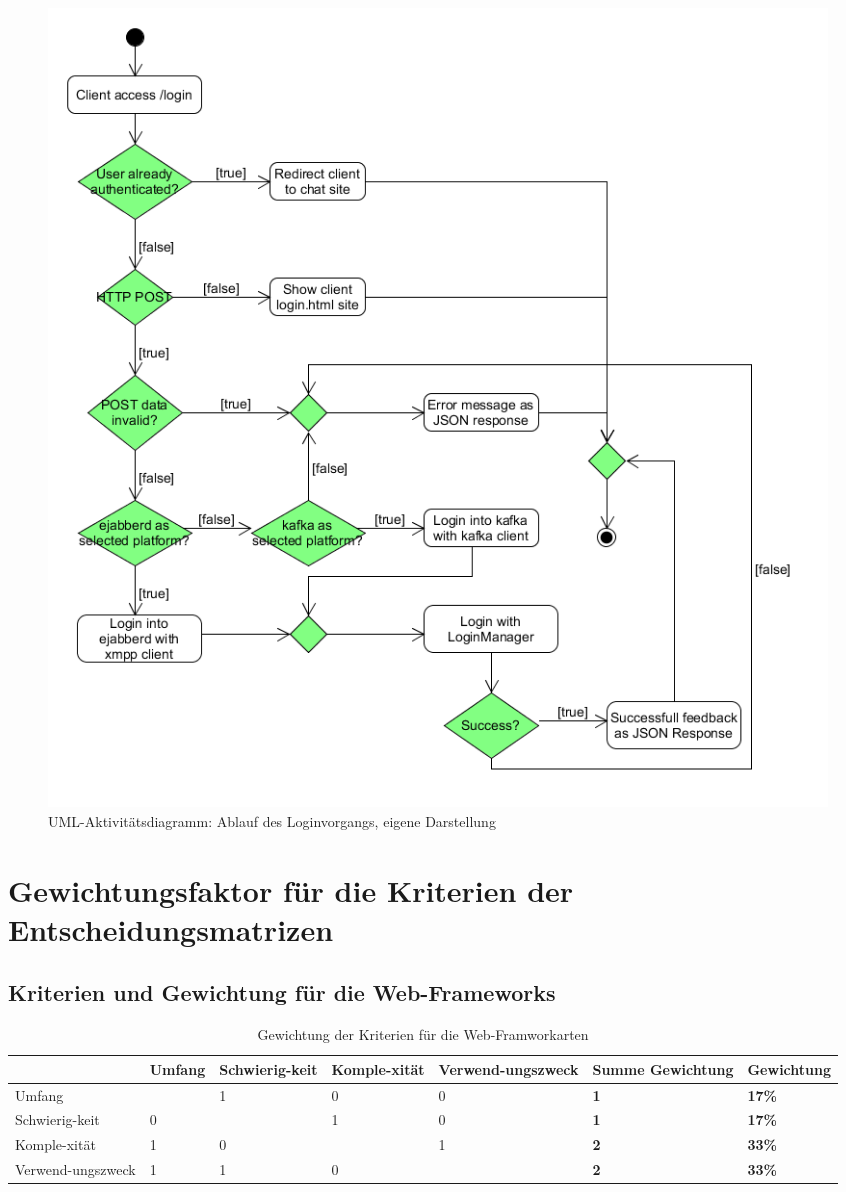 \documentclass[a4paper,titlepage,halfparskip,12pt]{scrreprt}
\begin{document}
\begin{figure}[h]
	\centering
	\includegraphics[width=\textwidth]{images/umlLogin}
	\caption{\acs{UML}-Aktivitätsdiagramm: Ablauf des Loginvorgangs, eigene Darstellung}
	\label{img:umlActivityLogin}
\end{figure}

\pagebreak

\chapter{Gewichtungsfaktor für die Kriterien der Entscheidungsmatrizen}
\section{Kriterien und Gewichtung für die Web-Frameworks}
\renewcommand{\arraystretch}{2}
\begin{table}[h]
	\centering
	\caption{Gewichtung der Kriterien für die Web-Framworkarten}
	\begin{tabular}{p{}|p{}|p{}|p{}|p{}|p{}|p{}|}
		& Umfang & Schwierig-keit & Komple-xität & Verwend-ungszweck & \textbf{Summe Gewichtung} & \textbf{Gewichtung}\\
		\hline
		Umfang & \cellcolor{gray} & 1 & 0 & 0 & \textbf{1} & \textbf{17\%}\\
		\hline
		Schwierig-keit & 0 & \cellcolor{gray} & 1 & 0 & \textbf{1} & \textbf{17\%}\\
		\hline
		Komple-xität & 1 & 0 & \cellcolor{gray} & 1 & \textbf{2} & \textbf{33\%}\\
		\hline
		Verwend-ungszweck & 1 & 1 & 0 & \cellcolor{gray} & \textbf{2} & \textbf{33\%}\\
		\hline
	\end{tabular}
	\label{tab:GewichtungWebFramework}
\end{table}
\pagebreak
\end{document}
